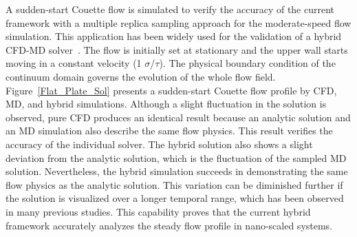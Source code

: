 \documentclass[preprint,12pt]{elsarticle}
\begin{document}

A sudden-start Couette flow is simulated to verify the accuracy of the current framework with a multiple replica sampling approach for the moderate-speed flow simulation. This application has been widely used for the validation of a hybrid CFD-MD solver~\cite{Nie,Yen}. The flow is initially set at stationary and the upper wall starts moving in a constant velocity (1 $\sigma$/$\tau$). The physical boundary condition of the continuum domain governs the evolution of the whole flow field. Figure~\ref{Flat_Plate_Sol} presents a sudden-start Couette flow profile by CFD, MD, and hybrid simulations. Although a slight fluctuation in the solution is observed, pure CFD produces an identical result because an analytic solution and an MD simulation also describe the same flow physics. This result verifies the accuracy of the individual solver. The hybrid solution also shows a slight deviation from the analytic solution, which is the fluctuation of the sampled MD solution. Nevertheless, the hybrid simulation succeeds in demonstrating the same flow physics as the analytic solution. This variation can be diminished further if the solution is visualized over a longer temporal range, which has been observed in many previous studies. This capability proves that the current hybrid framework accurately analyzes the steady flow profile in nano-scaled systems.
\end{document}

